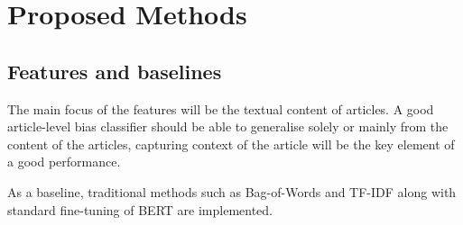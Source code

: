 \chapter{Proposed Methods}
\label{cha:5}

\section{Features and baselines}

The main focus of the features will be the textual content of articles. A good article-level bias classifier should be able to generalise solely or mainly from the content of the articles, capturing context of the article will be the key element of a good performance.

As a baseline, traditional methods such as Bag-of-Words and TF-IDF along with standard fine-tuning of BERT are implemented.

\begin{comment}
Correlation between sentiment and bias?

Following from (\citealt{chen-2020-detecting-media-bias-gaussian},\citealt{van-den-berg-2020-contex-informational-bias-detection}, \citealt{guo-2022-modeling}, and \citealt{maab-2023-lexical-bias-detection}), experiments will be done with techniques from these past works, particularly on context-building.

Other representation techniques such as Doc2Vec \citep{mikolov-2014-doc2vec} and Multivec \citep{berard-2016-multivec} will also be considered.

Sentiment analysis can be beneficial as additional features, find relationships and correlation between sentiment and bias. (find ref)

MultiVec includes word2vec's features, paragraph vector (batch and online) and bivec for bilingual distributed representations. MultiVec also includes different distance measures between words and sequences of words.
\end{comment}

